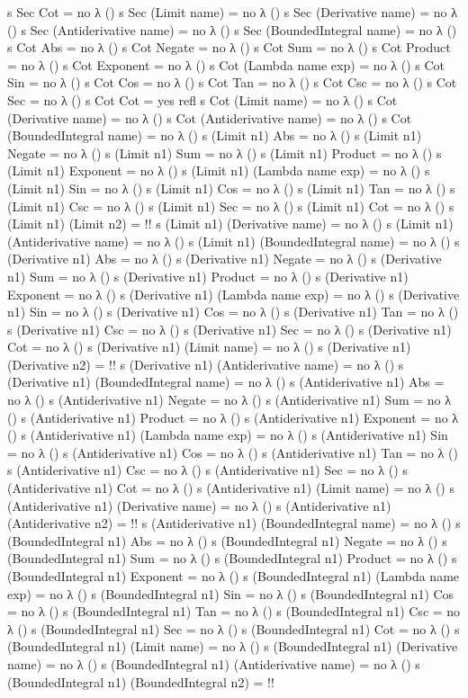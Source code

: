 \documentclass{report}
\begin{document}
\begin{code}
  s Sec Cot = no λ ()
  s Sec (Limit name) = no λ ()
  s Sec (Derivative name) = no λ ()
  s Sec (Antiderivative name) = no λ ()
  s Sec (BoundedIntegral name) = no λ ()
  s Cot Abs = no λ ()
  s Cot Negate = no λ ()
  s Cot Sum = no λ ()
  s Cot Product = no λ ()
  s Cot Exponent = no λ ()
  s Cot (Lambda name exp) = no λ ()
  s Cot Sin = no λ ()
  s Cot Cos = no λ ()
  s Cot Tan = no λ ()
  s Cot Csc = no λ ()
  s Cot Sec = no λ ()
  s Cot Cot = yes refl
  s Cot (Limit name) = no λ ()
  s Cot (Derivative name) = no λ ()
  s Cot (Antiderivative name) = no λ ()
  s Cot (BoundedIntegral name) = no λ ()
  s (Limit n1) Abs = no λ ()
  s (Limit n1) Negate = no λ ()
  s (Limit n1) Sum = no λ ()
  s (Limit n1) Product = no λ ()
  s (Limit n1) Exponent = no λ ()
  s (Limit n1) (Lambda name exp) = no λ ()
  s (Limit n1) Sin = no λ ()
  s (Limit n1) Cos = no λ ()
  s (Limit n1) Tan = no λ ()
  s (Limit n1) Csc = no λ ()
  s (Limit n1) Sec = no λ ()
  s (Limit n1) Cot = no λ ()
  s (Limit n1) (Limit n2) = {!!}
  s (Limit n1) (Derivative name) = no λ ()
  s (Limit n1) (Antiderivative name) = no λ ()
  s (Limit n1) (BoundedIntegral name) = no λ ()
  s (Derivative n1) Abs = no λ ()
  s (Derivative n1) Negate = no λ ()
  s (Derivative n1) Sum = no λ ()
  s (Derivative n1) Product = no λ ()
  s (Derivative n1) Exponent = no λ ()
  s (Derivative n1) (Lambda name exp) = no λ ()
  s (Derivative n1) Sin = no λ ()
  s (Derivative n1) Cos = no λ ()
  s (Derivative n1) Tan = no λ ()
  s (Derivative n1) Csc = no λ ()
  s (Derivative n1) Sec = no λ ()
  s (Derivative n1) Cot = no λ ()
  s (Derivative n1) (Limit name) = no λ ()
  s (Derivative n1) (Derivative n2) = {!!}
  s (Derivative n1) (Antiderivative name) = no λ ()
  s (Derivative n1) (BoundedIntegral name) = no λ ()
  s (Antiderivative n1) Abs = no λ ()
  s (Antiderivative n1) Negate = no λ ()
  s (Antiderivative n1) Sum = no λ ()
  s (Antiderivative n1) Product = no λ ()
  s (Antiderivative n1) Exponent = no λ ()
  s (Antiderivative n1) (Lambda name exp) = no λ ()
  s (Antiderivative n1) Sin = no λ ()
  s (Antiderivative n1) Cos = no λ ()
  s (Antiderivative n1) Tan = no λ ()
  s (Antiderivative n1) Csc = no λ ()
  s (Antiderivative n1) Sec = no λ ()
  s (Antiderivative n1) Cot = no λ ()
  s (Antiderivative n1) (Limit name) = no λ ()
  s (Antiderivative n1) (Derivative name) = no λ ()
  s (Antiderivative n1) (Antiderivative n2) = {!!}
  s (Antiderivative n1) (BoundedIntegral name) = no λ ()
  s (BoundedIntegral n1) Abs = no λ ()
  s (BoundedIntegral n1) Negate = no λ ()
  s (BoundedIntegral n1) Sum = no λ ()
  s (BoundedIntegral n1) Product = no λ ()
  s (BoundedIntegral n1) Exponent = no λ ()
  s (BoundedIntegral n1) (Lambda name exp) = no λ ()
  s (BoundedIntegral n1) Sin = no λ ()
  s (BoundedIntegral n1) Cos = no λ ()
  s (BoundedIntegral n1) Tan = no λ ()
  s (BoundedIntegral n1) Csc = no λ ()
  s (BoundedIntegral n1) Sec = no λ ()
  s (BoundedIntegral n1) Cot = no λ ()
  s (BoundedIntegral n1) (Limit name) = no λ ()
  s (BoundedIntegral n1) (Derivative name) = no λ ()
  s (BoundedIntegral n1) (Antiderivative name) = no λ ()
  s (BoundedIntegral n1) (BoundedIntegral n2) = {!!}
\end{code}
\end{document}
